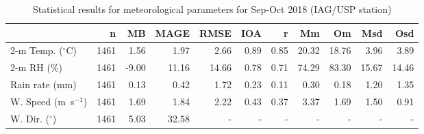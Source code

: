 \begin{table}
\centering
\caption{Statistical results for meteorological parameters for Sep-Oct 2018 (IAG/USP station)}
\label{tab:stats_iag}
\begin{tabular}{lrrrrrrrrrr}
\toprule
{} &     n &    MB &   MAGE &   RMSE &   IOA &     r &     Mm &     Om &    Msd &    Osd \\
\midrule
2-m Temp. ($^{\circ}$C) &  1461 &  1.56 &   1.97 &   2.66 &  0.89 &  0.85 &  20.32 &  18.76 &   3.96 &   3.89 \\
2-m RH (\%) &  1461 & -9.00 &  11.16 &  14.66 &  0.78 &  0.71 &  74.29 &  83.30 &  15.67 &  14.46 \\
Rain rate (mm) &  1461 &  0.13 &   0.42 &   1.72 &  0.23 &  0.11 &   0.30 &   0.18 &   1.20 &   1.35 \\
W. Speed (m~s$^{-1}$)&  1461 &  1.69 &   1.84 &   2.22 &  0.43 &  0.37 &   3.37 &   1.69 &   1.50 &   0.91 \\
W. Dir. ($^{\circ}$) &  1461 &  5.03 &  32.58 &    - &   - &   - &    - &    - &    - &    - \\
\bottomrule
\end{tabular}
\end{table}

